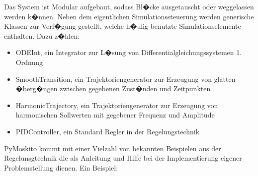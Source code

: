 \documentclass[a4paper]{scrartcl}
\begin{document}
Das System ist Modular aufgebaut, sodass Bl�cke ausgetauscht oder weggelassen werden k�nnen. Neben dem eigentlichen Simulationssteuerung werden generische Klassen zur Verf�gung gestellt, welche h�ufig benutzte Simulationselemente enthalten. Dazu z�hlen:
\begin{itemize}
	\item ODEInt, ein Integrator zur L�sung von Differentialgleichungssystemen 1. Ordnung
	\item SmoothTransition, ein Trajektoriengenerator zur Erzeugung von glatten �berg�ngen zwischen gegebenen Zust�nden und Zeitpunkten
	\item HarmonicTrajectory, ein Trajektoriengenerator zur Erzeugung von harmonischen Sollwerten mit gegebener Frequenz und Amplitude
	\item PIDController, ein Standard Regler in der Regelungstechnik
\end{itemize}

PyMoskito kommt mit einer Vielzahl von bekannten Beispielen aus der Regelunsgtechnik die als Anleitung und Hilfe bei der Implementierung eigener Problemstellung dienen. Ein Beispiel:
\end{document}
